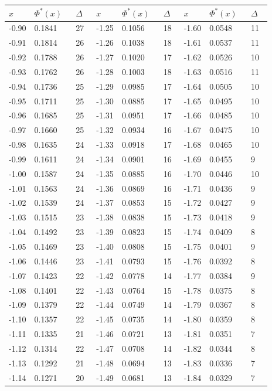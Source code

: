 \documentclass[russian, 12pt, fleqn,x11names]{article}
\begin{document}
\newpage
\noindent 
\begin{center}
\begin{tabular}[b]{ | l | l |  l || l | l | l || l | l |  l |  }
\hline
$x\ \ \ \ \ $&$\Phi^*(x)\ \ \ $&$\Delta\ \ \ $&$x\ \ \ \ \ $&$\Phi^*(x)\ \ \ $&$\Delta\ \ \ $&$x\ \ \ \ \ $&$\Phi^*(x)\ \ \ $&$\Delta\ \ \ $\\
\hline
-0.90&0.1841&27&-1.25&0.1056&18&-1.60&0.0548&11\\%
-0.91&0.1814&26&-1.26&0.1038&18&-1.61&0.0537&11 \\%
-0.92&0.1788&26&-1.27&0.1020&17&-1.62&0.0526&10 \\%
-0.93&0.1762&26&-1.28&0.1003&18&-1.63&0.0516&11 \\%
-0.94&0.1736&25&-1.29&0.0985&17&-1.64&0.0505&10 \\%
-0.95&0.1711&25&-1.30&0.0885&17&-1.65&0.0495&10 \\%

-0.96&0.1685&25&-1.31&0.0951&17&-1.66&0.0485&10 \\%
-0.97&0.1660&25&-1.32&0.0934&16&-1.67&0.0475&10 \\%
-0.98&0.1635&24&-1.33&0.0918&17&-1.68&0.0465&10 \\%
-0.99&0.1611&24&-1.34&0.0901&16&-1.69&0.0455&9\\%

-1.00&0.1587&24&-1.35&0.0885&16&-1.70&0.0446&10\\%
-1.01&0.1563&24&-1.36&0.0869&16&-1.71&0.0436&9\\%
-1.02&0.1539&24&-1.37&0.0853&15&-1.72&0.0427&9\\%
-1.03&0.1515&23&-1.38&0.0838&15&-1.73&0.0418&9\\%
-1.04&0.1492&23&-1.39&0.0823&15&-1.74&0.0409&8\\%

-1.05&0.1469&23&-1.40&0.0808&15&-1.75&0.0401&9\\%
-1.06&0.1446&23&-1.41&0.0793&15&-1.76&0.0392&8\\%
-1.07&0.1423&22&-1.42&0.0778&14&-1.77&0.0384&9\\%
-1.08&0.1401&22&-1.43&0.0764&15&-1.78&0.0375&8\\%
-1.09&0.1379&22&-1.44&0.0749&14&-1.79&0.0367&8\\%

-1.10&0.1357&22&-1.45&0.0735&14&-1.80&0.0359&8\\%
-1.11&0.1335&21&-1.46&0.0721&13&-1.81&0.0351&7\\%
-1.12&0.1314&22&-1.47&0.0708&14&-1.82&0.0344&8\\%
-1.13&0.1292&21&-1.48&0.0694&13&-1.83&0.0336&7\\%
-1.14&0.1271&20&-1.49&0.0681&13&-1.84&0.0329&7\\%


\end{tabular}
\end{center}
\end{document}

